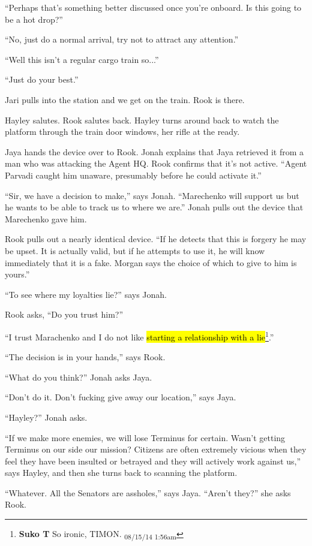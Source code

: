 ``Perhaps that's something better discussed once you're onboard.  Is this going to be a hot drop?''

``No, just do a normal arrival, try not to attract any attention.''

``Well this isn't a regular cargo train so...''

``Just do your best.''



Jari pulls into the station and we get on the train.  Rook is there.

Hayley salutes.  Rook salutes back.  Hayley turns around back to watch the platform through the train door windows, her rifle at the ready.

Jaya hands the device over to Rook.  Jonah explains that Jaya retrieved it from a man who was attacking the Agent HQ.  Rook confirms that it's not active.  ``Agent Parvadi caught him unaware, presumably before he could activate it.''

``Sir, we have a decision to make,'' says Jonah.  ``Marechenko will support us but he wants to be able to track us to where we are.''  Jonah pulls out the device that Marechenko gave him.

Rook pulls out a nearly identical device.  ``If he detects that this is forgery he may be upset.  It is actually valid, but if he attempts to use it, he will know immediately that it is a fake.  Morgan says the choice of which to give to him is yours.''

``To see where my loyalties lie?'' says Jonah.   

Rook asks, ``Do you trust him?''

``I trust Marachenko and I do not like \hl{starting a relationship with a lie}\footnote{\textbf{Suko T }So ironic, TIMON. \textsubscript{08/15/14 1:56am}}.''

``The decision is in your hands,'' says Rook.

``What do you think?'' Jonah asks Jaya.

``Don't do it.  Don't fucking give away our location,'' says Jaya.

``Hayley?'' Jonah asks.

``If we make more enemies, we will lose Terminus for certain.  Wasn't getting Terminus on our side our mission?  Citizens are often extremely vicious when they feel they have been insulted or betrayed and they will actively work against us,'' says Hayley, and then she turns back to scanning the platform.

``Whatever. All the Senators are assholes,'' says Jaya.  ``Aren't they?'' she asks Rook.

